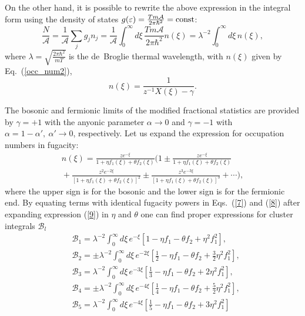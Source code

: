\documentclass[12pt,a4paper]{article}
\def\eps{\varepsilon}
\def\ds{\displaystyle}
\begin{document}
On the other hand, it is possible to rewrite the above expression in the integral form using the density of states $g(\eps) = \frac{Tm\mathcal{A}}{2\pi \hbar^2}={\rm const}$:
\begin{equation}\label{8}
\frac{N}{\mathcal{A}}=\frac{1}{\mathcal{A}}\sum_{j}g_jn_j=\frac{1}{\mathcal{A}}\int_{0}^{\infty}d\xi\, \frac{Tm\mathcal{A}}{2\pi \hbar^2}n(\xi)=\lambda^{-2}\int_{0}^{\infty}d\xi\, n(\xi),
\end{equation}
where $\ds\lambda=\sqrt{\frac{2\pi\hbar^2}{mT}}$ is the de~Broglie thermal wavelength, with $n(\xi)$ given by Eq.~(\ref{occ_num2}),
\begin{equation}\label{occ_num2a}
n(\xi)=\frac{1}{z^{-1}X\left(\xi\right)-\gamma}.
\end{equation}

The bosonic and fermionic limits of the modified fractional statistics are provided by $\gamma=+1$ with the anyonic parameter $\alpha\to 0$ and $\gamma=-1$ with $\alpha=1-\alpha',\ \alpha'\to 0$, respectively. Let us expand the expression for occupation numbers in fugacity:
\begin{multline}\label{9}
n(\xi)=\frac{ze^{-\xi}}{1+\eta f_1(\xi)+\theta f_2(\xi)}\Big(1\pm\frac{ze^{-\xi}}{1+\eta f_1(\xi)+\theta f_2(\xi)} {} \\ {}+ \frac{z^2e^{-2\xi}}{[1+\eta f_1(\xi)+\theta f_2(\xi)]^2}\pm\frac{z^3e^{-3\xi}}{[1+\eta f_1(\xi)+\theta f_2(\xi)]^3}+\cdots\Big),
\end{multline}
where the upper sign is for the bosonic and the lower sign is for the fermionic end.
By equating terms with identical fugacity powers in Eqs.~(\ref{7}) and (\ref{8}) after expanding expression (\ref{9}) in $\eta$ and $\theta$ one can find proper expressions for cluster integrals $\mathcal{B}_l$
\begin{align}\label{10}
&\mathcal{B}_1=\lambda^{-2}\int_{0}^{\infty}d\xi\, e^{-\xi}\left[1-\eta f_1-\theta f_2+\eta^2f_1^2\right],\nonumber \\[6pt]
%
&\mathcal{B}_2=\pm\lambda^{-2}\int_{0}^{\infty}d\xi\, e^{-2\xi}\left[\frac{1}{2}-\eta f_1-\theta f_2+\frac{3}{2}\eta^2f_1^2\right], \nonumber \\[6pt]
%
&\mathcal{B}_3=\lambda^{-2}\int_{0}^{\infty}d\xi\, e^{-3\xi}\left[\frac{1}{3}-\eta f_1-\theta f_2+2\eta^2f_1^2\right],\\[6pt]
%
&\mathcal{B}_4=\pm\lambda^{-2}\int_{0}^{\infty}d\xi\, e^{-4\xi}\left[\frac{1}{4}-\eta f_1-\theta f_2+\frac{5}{2}\eta^2f_1^2\right],\nonumber\\[6pt]
%
&\mathcal{B}_5=\lambda^{-2}\int_{0}^{\infty}d\xi\, e^{-4\xi}\left[\frac{1}{5}-\eta f_1-\theta f_2+3\eta^2f_1^2\right] \nonumber
\end{align}
\end{document}
